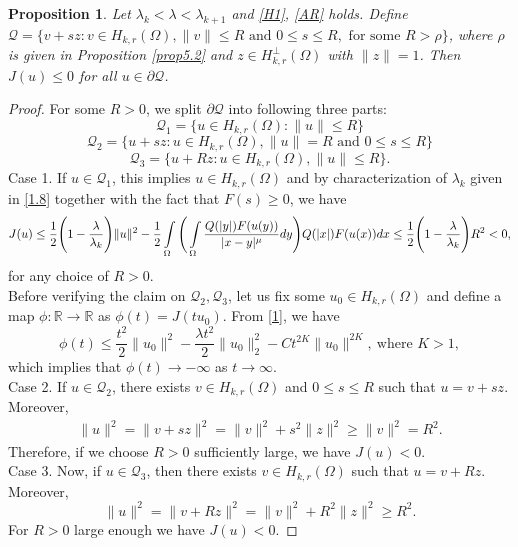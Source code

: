 \documentclass[11pt]{amsart}
\numberwithin{equation}{section}
\newtheorem{prop}[thm]{Proposition}
\newcommand{\R}{\mathbb{R}}
\newcommand{\1}{\frac{1}{2}}
\begin{document}
	\begin{prop}
		\label{prop5.3}
		Let $\lambda_k < \lambda < \lambda_{k+1}$ and \eqref{H1}, \eqref{AR} holds. Define $\mathcal Q = \{ v+sz : v\in H_{k,r}(\Omega), \|v\| \leq R \text{ and } 0 \leq s \leq R, \text{ for some } R> \rho\}$, where $\rho$ is given in Proposition \ref{prop5.2} and $z \in H_{k,r}^\perp(\Omega)$ with $\|z\|=1$. Then $J(u) \leq 0$ for all $u\in \partial \mathcal Q$.
	\end{prop}
	\begin{proof}
		For some $R>0$, we split $\partial \mathcal Q$ into following three parts:\\
		$$ \mathcal Q_1 =\{ u\in H_{k,r}(\Omega): \|u\| \leq R\}$$
		$$ \mathcal Q_2= \{ u+sz: u\in H_{k,r}(\Omega), \|u\|=R \text{ and } 0\leq s\leq R\}$$
		$$\mathcal Q_3 = \{ u+Rz: u\in H_{k,r}(\Omega), \|u\|\leq R\}.$$
		Case 1. If $u\in \mathcal Q_1$, this implies $u\in H_{k,r}(\Omega)$ and by characterization of $\lambda_k$ given in \eqref{1.8} together with the fact that $F(s)\geq 0$, we have
		\begin{equation*}
			J(u) \leq \frac{1}{2}\Bigg( 1-\frac{\lambda}{\lambda_k}\Bigg)\|u\|^2 -\frac{1}{2} \int\limits\limits_\Omega \Bigg( \int\limits\limits_\Omega \frac{Q(|y|)F(u(y))}{|x-y|^\mu}dy\Bigg) Q(|x|)F(u(x))dx\leq \frac{1}{2}\Bigg( 1-\frac{\lambda}{\lambda_k}\Bigg)R^2<0,
		\end{equation*}
		for any choice of $R>0$.\\
		Before verifying the claim on $\mathcal Q_2, \mathcal Q_3$, let us fix some $u_0 \in H_{k,r}(\Omega)$ and define a map $\phi: \R \rightarrow \R$ as $\phi(t) = J(tu_0)$. From \eqref{1}, we have
		\begin{equation*}
			\phi(t) \leq \frac{t^2}{2} \|u_0\|^2 -\frac{\lambda t^2}{2} \|u_0\|^2_2 -C t^{2K} \|u_0\|^{2K}, \ \text{where } K>1,
		\end{equation*}
		which implies that $\phi(t) \rightarrow-\infty$ as $t\rightarrow\infty$.\\
		Case 2. If $u\in \mathcal Q_2$, there exists $v\in H_{k,r}(\Omega)$ and $0\leq s \leq R$ such that $u=v+sz$. Moreover,
		\begin{align*}
			\|u\|^2 = \|v+sz\|^2 = \|v\|^2 + s^2\|z\|^2 \geq \|v\|^2 =R^2.
		\end{align*}
		Therefore, if we choose $R>0$ sufficiently large, we have $J(u)<0$. \\
		Case 3. Now, if $u\in \mathcal Q_3$, then there exists $v\in H_{k,r}(\Omega)$ such that $u=v+Rz$. Moreover,
		\begin{equation*}
			\|u\|^2 = \|v+Rz\|^2 = \|v\|^2 +R^2\|z\|^2 \geq R^2.
		\end{equation*}
		For $R>0$ large enough we have $J(u)<0$. 
	\end{proof}
\end{document}
